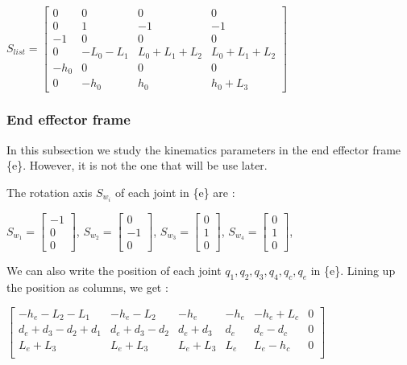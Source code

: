 \begin{center}
    $S_{list} = 
    \begin{bmatrix}
        0 & 0 & 0 & 0 \\
        0 & 1 & -1 & -1 \\
        -1 & 0 & 0 & 0 \\
        0 & -L_0-L_1 & L_0+L_1+L_2 & L_0+L_1+L_2 \\
        -h_0 & 0 & 0 & 0 \\
        0 & -h_0 & h_0 & h_0+L_3
    \end{bmatrix}
    $
\end{center}

\subsubsection{End effector frame}

\hspace{\parindent} In this subsection we study the kinematics parameters in the end effector frame \{e\}. However, it is not the one that will be use later. 

\bigbreak
The rotation axis $S_{w_i}$ of each joint  in \{e\} are : 
\begin{center}
    $S_{w_1} = \begin{bmatrix} -1 \\ 0 \\ 0\end{bmatrix}$,
    $S_{w_2} = \begin{bmatrix} 0 \\ -1 \\ 0\end{bmatrix}$,
    $S_{w_3} = \begin{bmatrix} 0 \\ 1 \\ 0\end{bmatrix}$,
    $S_{w_4} = \begin{bmatrix} 0 \\ 1 \\ 0\end{bmatrix}$,
\end{center}

\bigbreak
We can also write the position of each joint  $q_1,q_2,q_3,q_4,q_c,q_e$ in \{e\}. Lining up the position as columns, we get : 

\begin{center}
    $
    \begin{bmatrix}
        -h_e-L_2-L_1 & -h_e-L_2 & -h_e & -h_e & -h_e+L_c & 0  \\
        d_e+d_3-d_2+d_1 & d_e+d_3-d_2 & d_e+d_3 & d_e & d_e-d_c & 0 \\
        L_e+L_3 & L_e+L_3 & L_e+L_3 & L_e & L_e-h_c & 0 \\
    \end{bmatrix}
    $
\end{center}

